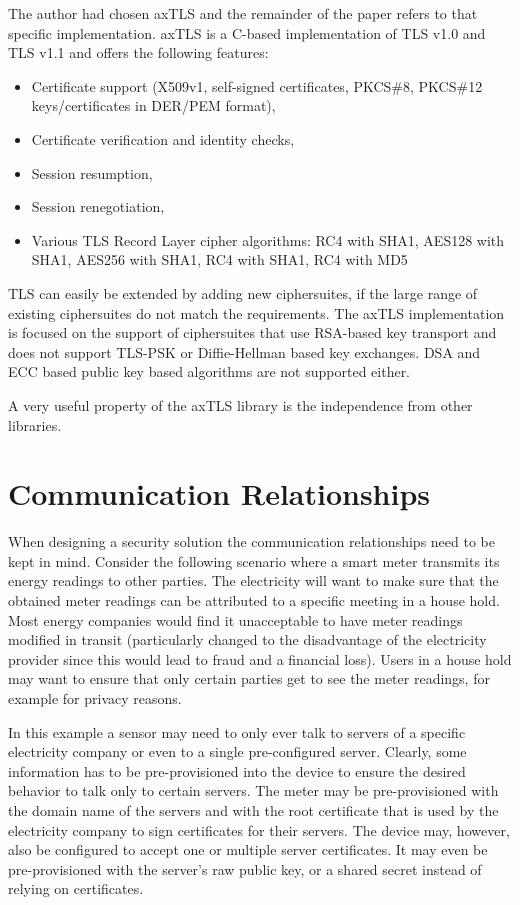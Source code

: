 \documentclass[a4paper, 10pt]{IEEEtran}
\begin{document}
The author had chosen axTLS and the remainder of the paper refers to that specific implementation. axTLS is a C-based implementation of TLS v1.0 and TLS v1.1 and offers the following features: 
\begin{itemize}
\item Certificate support (X509v1, self-signed certificates, PKCS\#8, PKCS\#12 keys/certificates in DER/PEM format), 
\item Certificate verification and identity checks, 
\item Session resumption,
\item Session renegotiation,
\item Various TLS Record Layer cipher algorithms: RC4 with SHA1, AES128 with SHA1, AES256 with SHA1,  RC4 with SHA1, RC4 with MD5
\end{itemize}

TLS can easily be extended by adding new ciphersuites, if the large range of existing ciphersuites \cite{TLS-IANA} do not match the requirements. The axTLS implementation is focused on the support of ciphersuites that use RSA-based key transport and does not support TLS-PSK or Diffie-Hellman based key exchanges. DSA and ECC based public key based algorithms are not supported either. 

A very useful property of the axTLS library is the independence from other libraries. 

\section{Communication Relationships}
\label{relationships} 

When designing a security solution the communication relationships need to be kept in mind. Consider the following scenario where a smart meter transmits its energy readings to other parties. The electricity will want to make sure that the obtained meter readings can be attributed to a specific meeting in a house hold. Most energy companies would find it unacceptable to have meter readings modified in transit (particularly changed to the disadvantage of the electricity provider since this would lead to fraud and a financial loss). Users in a house hold may want to ensure that only certain parties get to see the meter readings, for example for privacy reasons.  

In this example a sensor may need to only ever talk to servers of a specific electricity company or even to a single pre-configured server. Clearly, some information has to be pre-provisioned into the device to ensure the desired behavior to talk only to certain servers. The meter may be pre-provisioned with the domain name of the servers and with the root certificate that is used by the electricity company to sign certificates for their servers. The device may, however, also be configured to accept one or multiple server certificates. It may even be pre-provisioned with the server's raw public key, or a shared secret instead of relying on certificates. 
\end{document}
